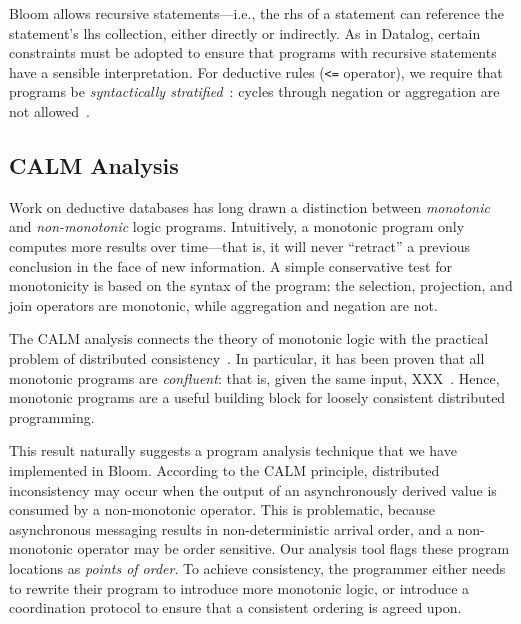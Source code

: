 Bloom allows recursive statements---i.e., the rhs of a statement can reference
the statement's lhs collection, either directly or indirectly. As in Datalog,
certain constraints must be adopted to ensure that programs with recursive
statements have a sensible interpretation. For deductive rules (\verb+<=+
operator), we require that programs be \emph{syntactically
  stratified}~\cite{Apt1988}: cycles through negation or aggregation are not
allowed~\cite{dedalus}.

\subsection{CALM Analysis}
\label{sec:bg-calm}

Work on deductive databases has long drawn a distinction between
\emph{monotonic} and \emph{non-monotonic} logic programs. Intuitively, a
monotonic program only computes more results over time---that is, it will never
``retract'' a previous conclusion in the face of new information. A simple
conservative test for monotonicity is based on the syntax of the program: the
selection, projection, and join operators are monotonic, while aggregation and
negation are not.

The CALM analysis connects the theory of monotonic logic with the practical
problem of distributed consistency~\cite{Alvaro2011}. In particular, it has been
proven that all monotonic programs are \emph{confluent}: that is, given the same
input, XXX~\cite{Ameloot2011}. Hence, monotonic programs are a useful building
block for loosely consistent distributed programming.

This result naturally suggests a program analysis technique that we have
implemented in Bloom. According to the CALM principle, distributed inconsistency
may occur when the output of an asynchronously derived value is consumed by a
non-monotonic operator. This is problematic, because asynchronous messaging
results in non-deterministic arrival order, and a non-monotonic operator may be
order sensitive. Our analysis tool flags these program locations as \emph{points
  of order}. To achieve consistency, the programmer either needs to rewrite
their program to introduce more monotonic logic, or introduce a coordination
protocol to ensure that a consistent ordering is agreed upon.

